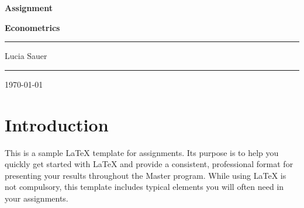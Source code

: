 \documentclass[12pt,a4paper]{article}
\begin{document}
\begin{titlepage}
\centering

\par\vspace{0.75cm}
	{\huge\bfseries Assignment \par}
    {\large\bfseries Econometrics\par}
	\vspace{0.25cm}
    \noindent\rule{\textwidth}{1pt}
    {\Large Lucia Sauer \par}
    \noindent\rule{\textwidth}{1pt}
	\vfill
	{\large \today\par}
\end{titlepage}

\tableofcontents

\newpage

\section{Introduction}
This is a sample LaTeX template for assignments. Its purpose is to help you quickly get started with LaTeX and provide a consistent, professional format for presenting your results throughout the Master program. While using LaTeX is not compulsory, this template includes typical elements you will often need in your assignments.


\newpage

\newpage



\end{document}
